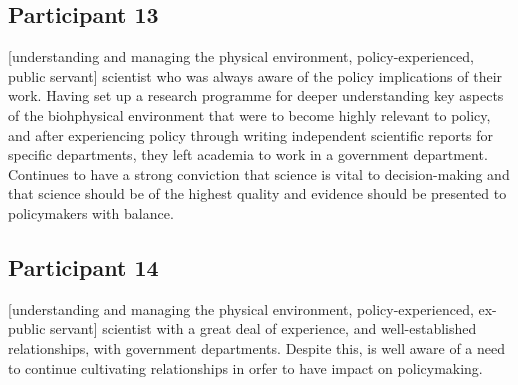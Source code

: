 \subsection{Participant 13}\label{sec:p13}
[understanding and managing the physical environment, policy-experienced, public servant] scientist who was always aware of the policy implications of their work. Having set up a research programme for deeper understanding key aspects of the biohphysical environment that were to become highly relevant to policy, and after experiencing policy through writing independent scientific reports for specific departments, they left academia to work in a government department. Continues to have a strong conviction that science is vital to decision-making and that science should be of the highest quality and evidence should be presented to policymakers with balance. 

\subsection{Participant 14}\label{sec:p14}
[understanding and managing the physical environment, policy-experienced, ex-public servant] scientist with a great deal of experience, and well-established relationships, with government departments. Despite this, is well aware of a need to continue cultivating relationships in orfer to have impact on policymaking. 